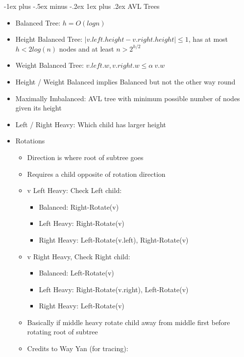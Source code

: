 \documentclass[10pt, landscape]{article}
\makeatletter
\renewcommand{\subsection}{\@startsection{subsection}{3}{0mm}%
                                {-1ex plus -.5ex minus -.2ex}%
                                {1ex plus .2ex}%
                                {\normalfont\small\bfseries}}%
\makeatother
\begin{document}
\begin{multicols*}{4}
\subsection{AVL Trees}
\begin{itemize}
    \item Balanced Tree: $h=O(logn)$
    \item Height Balanced Tree: $|v.left.height - v.right.height| \leq 1$, has at most $h < 2log(n)$ nodes and at least $n > 2^{h/2}$
    \item Weight Balanced Tree: $v.left.w, v.right.w \leq \alpha \ v.w$
    \item Height / Weight Balanced implies Balanced but not the other way round
    \item Maximally Imbalanced: AVL tree with minimum possible number of nodes given its height
    \item Left / Right Heavy: Which child has larger height
    \item Rotations
    \begin{itemize}
        \item Direction is where root of subtree goes
        \item Requires a child opposite of rotation direction
        \item v Left
        Heavy: Check Left child:
        \begin{itemize}
            \item Balanced: Right-Rotate(v)
            \item Left Heavy: Right-Rotate(v)
            \item Right Heavy: Left-Rotate(v.left), Right-Rotate(v)
        \end{itemize}
        \item v Right
        Heavy, Check Right child:
        \begin{itemize}
            \item Balanced: Left-Rotate(v)
            \item Left Heavy: Right-Rotate(v.right), Left-Rotate(v)
            \item Right Heavy: Left-Rotate(v)
        \end{itemize}
        \item Basically if middle heavy rotate child away from middle first before rotating root of subtree
        \item Credits to Way Yan (for tracing):
    \end{itemize}
\end{itemize}

\end{multicols*}
\end{document}

